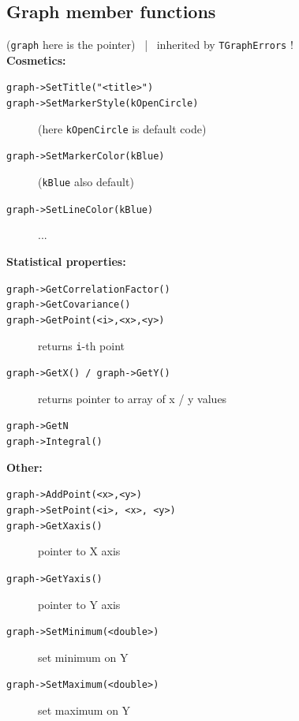 \documentclass[10pt, oneside]{article}
\begin{document}
\subsection{Graph member functions}
(\texttt{graph} here is the pointer) \, | \, inherited by \texttt{TGraphErrors} !\\
\textbf{Cosmetics:}
\begin{description}
\item[\texttt{graph->SetTitle("<title>")}]
\item[\texttt{graph->SetMarkerStyle(kOpenCircle)}] (here \texttt{kOpenCircle} is default code)
\item[\texttt{graph->SetMarkerColor(kBlue)}] (\texttt{kBlue} also default)
\item[\texttt{graph->SetLineColor(kBlue)}] ...
\end{description}
\textbf{Statistical properties:}
\begin{description}
\item[\texttt{graph->GetCorrelationFactor()}]
\item[\texttt{graph->GetCovariance()}]
\item[\texttt{graph->GetPoint(<i>,<x>,<y>)}] returns \texttt{i}-th point
\item[\texttt{graph->GetX() / graph->GetY()}] returns pointer to array of x / y values
\item[\texttt{graph->GetN}]
\item[\texttt{graph->Integral()}]
\end{description}
\textbf{Other:}
\begin{description}
\item[\texttt{graph->AddPoint(<x>,<y>)}]
\item[\texttt{graph->SetPoint(<i>, <x>, <y>)}]
\item[\texttt{graph->GetXaxis()}] pointer to X axis
\item[\texttt{graph->GetYaxis()}] pointer to Y axis
\item[\texttt{graph->SetMinimum(<double>)}] set minimum on Y
\item[\texttt{graph->SetMaximum(<double>)}] set maximum on Y
\end{description}
\end{document}
